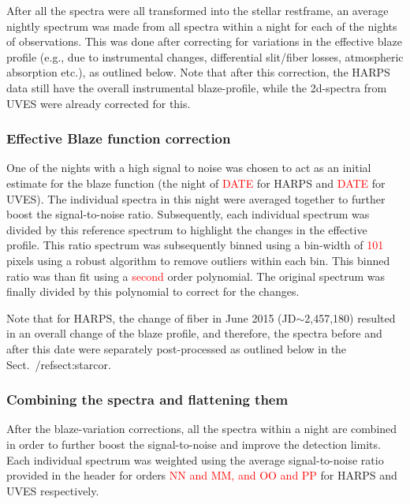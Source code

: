 \documentclass{aa}
\begin{document}
%
After all the spectra were all transformed into the stellar restframe, an average nightly spectrum was made from all spectra within a night for each of the nights of observations. This was done after correcting for variations in the effective blaze profile (e.g., due to instrumental changes, differential slit/fiber losses, atmospheric absorption etc.), as outlined below. Note that after this correction, the HARPS data still have the overall instrumental blaze-profile, while the 2d-spectra from UVES were already corrected for this.


\subsubsection{Effective Blaze function correction}\label{sect:blaze}

One of the nights with a high signal to noise was chosen to act as an initial estimate for the blaze function (the night of \textcolor{red}{DATE} for HARPS and \textcolor{red}{DATE} for UVES). The individual spectra in this night were averaged together to further boost the signal-to-noise ratio. Subsequently, each individual spectrum was divided by this reference spectrum to highlight the changes in the effective profile. This ratio spectrum was subsequently binned using a bin-width of \textcolor{red}{101} pixels using a robust algorithm to remove outliers within each bin. This binned ratio was than fit using a \textcolor{red}{second} order polynomial. The original spectrum was finally divided by this polynomial to correct for the changes.

Note that for HARPS, the change of fiber in June 2015 (JD$\sim$2,457,180) resulted in an overall change of the blaze profile, and therefore, the spectra before and after this date were separately post-processed as outlined below in the Sect.~/ref{sect:starcor}.



\subsubsection{Combining the spectra and flattening them}\label{sect:comb}
After the blaze-variation corrections, all the spectra within a night are combined in order to further boost the signal-to-noise and improve the detection limits. Each individual spectrum was weighted using the average signal-to-noise ratio provided in the header for orders \textcolor{red}{NN and MM, and OO and PP} for HARPS and UVES respectively.
\end{document}
